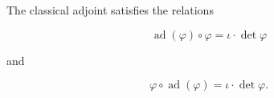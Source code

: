The classical adjoint satisfies the relations

$$\operatorname{ad}(\varphi) \circ \varphi = \iota \cdot \det \varphi$$

and

$$\varphi \circ \operatorname{ad}(\varphi) = \iota \cdot \det \varphi.$$
